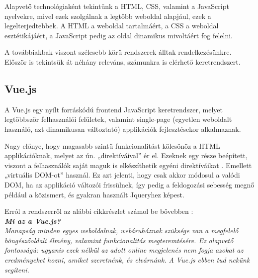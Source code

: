 
Alapvető technológiaként tekintünk a HTML, CSS, valamint a JavaScript nyelvekre, mivel ezek szolgálnak a legtöbb weboldal alapjául, ezek a legelterjedtebbek. A HTML a weboldal tartalmáért, a CSS a weboldal esztétikájáért, a JavaScript pedig az oldal dinamikus mivoltáért fog felelni.

A továbbiakbak viszont szélesebb körű rendszerek álltak rendelkezésünkre. Először is tekintsük át néhány releváns, számunkra is elérhető keretrendszert.




\subsection{Vue.js}

A Vue.js egy nyílt forráskódú frontend JavaScript keretrendszer, melyet legtöbbször felhasználói felületek, valamint single-page (egyetlen weboldalt használó, azt dinamikusan változtató) applikációk fejlesztésekor alkalmaznak.

Nagy előnye, hogy magasabb szintű funkcionalitást kölcsönöz a HTML applikációknak, melyet az ún. „direktíváival” ér el. Ezeknek egy része beépített, viszont a felhasználók saját maguk is elkészíthetik egyéni direktíváikat \cite{w3schoolsvue}. Emellett „virtuális DOM-ot” használ. Ez azt jelenti, hogy csak akkor módosul a valódi DOM, ha az applikáció változói frissülnek, így pedig a feldogozási sebesség megnő például a közismert, és gyakran használt Jqueryhez képest.

Erról a rendszerről az alábbi cikkrészlet számol be bővebben \cite{vuecikk}:\\

\noindent\textit{\textbf{\large{Mi az a Vue.js?}}}\\

\textit{Manapság minden egyes weboldalnak, webáruháznak szüksége van a megfelelő böngészőoldali élmény, valamint funkcionalitás megteremtésére. Ez alapvető fontosságú: ugyanis ezek nélkül az adott online megjelenés nem fogja azokat az eredményeket hozni, amiket szeretnénk, és elvárnánk. A Vue.js ebben tud nekünk segíteni.}

